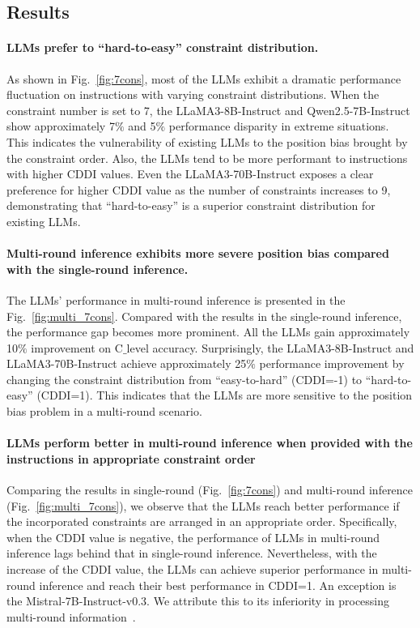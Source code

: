 \subsection{Results}
\paragraph*{LLMs prefer to “hard-to-easy” constraint distribution.} As shown in Fig.~\ref{fig:7cons}, most of the LLMs exhibit a dramatic performance fluctuation on instructions with varying constraint distributions. When the constraint number is set to 7, the LLaMA3-8B-Instruct and Qwen2.5-7B-Instruct show approximately 7$\%$ and 5$\%$ performance disparity in extreme situations. This indicates the vulnerability of existing LLMs to the position bias brought by the constraint order. Also, the LLMs tend to be more performant to instructions with higher CDDI values. Even the LLaMA3-70B-Instruct exposes a clear preference for higher CDDI value as the number of constraints increases to 9, demonstrating that ``hard-to-easy'' is a superior constraint distribution for existing LLMs.

\paragraph*{Multi-round inference exhibits more severe position bias compared with the single-round inference.} The LLMs' performance in multi-round inference is presented in the Fig.~\ref{fig:multi_7cons}. Compared with the results in the single-round inference, the performance gap becomes more prominent. All the LLMs gain approximately 10$\%$ improvement on C$\_$level accuracy. Surprisingly, the  LLaMA3-8B-Instruct and LLaMA3-70B-Instruct achieve approximately 25$\%$ performance improvement by changing the constraint distribution from ``easy-to-hard'' (CDDI=-1) to ``hard-to-easy'' (CDDI=1). This indicates that the LLMs are more sensitive to the position bias problem in a multi-round scenario.

\paragraph*{LLMs perform better in multi-round inference when provided with the instructions in appropriate constraint order} Comparing the results in single-round (Fig.~\ref{fig:7cons}) and multi-round inference (Fig.~\ref{fig:multi_7cons}), we observe that the LLMs reach better performance if the incorporated constraints are arranged in an appropriate order. Specifically, when the CDDI value is negative, the performance of LLMs in multi-round inference lags behind that in single-round inference. Nevertheless, with the increase of the CDDI value, the LLMs can achieve superior performance in multi-round inference and reach their best performance in CDDI=1. An exception is the Mistral-7B-Instruct-v0.3. We attribute this to its inferiority in processing multi-round information~\cite{chen2024sifo}.

